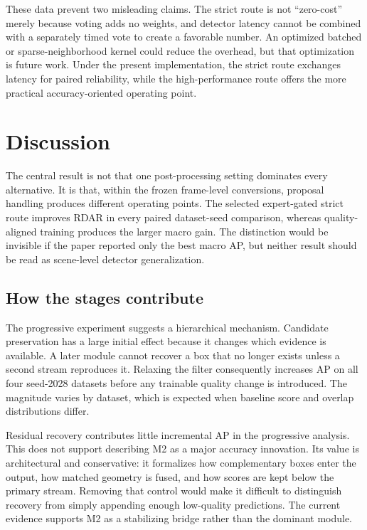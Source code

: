 \documentclass[preprint,12pt,times]{elsarticle}
\begin{document}
These data prevent two misleading claims. The strict route is not
``zero-cost'' merely because voting adds no weights, and detector latency
cannot be combined with a separately timed vote to create a favorable number.
An optimized batched or sparse-neighborhood kernel could reduce the overhead,
but that optimization is future work. Under the present implementation, the
strict route exchanges latency for paired reliability, while the
high-performance route offers the more practical accuracy-oriented operating
point.

\section{Discussion}

The central result is not that one post-processing setting dominates every
alternative. It is that, within the frozen frame-level conversions, proposal
handling produces different operating points. The selected expert-gated strict
route improves RDAR in every paired dataset-seed comparison, whereas
quality-aligned training produces the larger macro gain. The distinction would
be invisible if the paper reported only the best macro AP, but neither result
should be read as scene-level detector generalization.

\subsection{How the stages contribute}

The progressive experiment suggests a hierarchical mechanism. Candidate
preservation has a large initial effect because it changes which evidence is
available. A later module cannot recover a box that no longer exists unless a
second stream reproduces it. Relaxing the filter consequently increases AP on
all four seed-2028 datasets before any trainable quality change is introduced.
The magnitude varies by dataset, which is expected when baseline score and
overlap distributions differ.

Residual recovery contributes little incremental AP in the progressive analysis.
This does not support describing M2 as a major accuracy innovation. Its value
is architectural and conservative: it formalizes how complementary boxes enter
the output, how matched geometry is fused, and how scores are kept below the
primary stream. Removing that control would make it difficult to distinguish
recovery from simply appending enough low-quality predictions. The current
evidence supports M2 as a stabilizing bridge rather than the dominant module.
\end{document}
